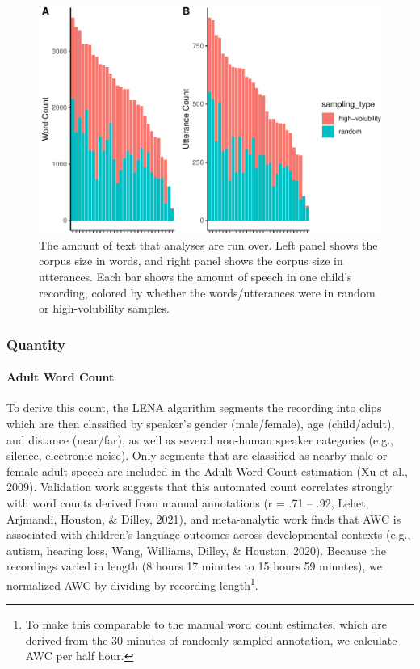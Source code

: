 \documentclass[
  man]{apa6}
\let\oldparagraph\paragraph
\renewcommand{\paragraph}[1]{\oldparagraph{#1}\mbox{}}
\begin{document}
\begin{figure}
\centering
\includegraphics{input_quality_manuscript_files/figure-latex/corpus-size-plots-1.pdf}
\caption{\label{fig:corpus-size-plots}The amount of text that analyses are run over. Left panel shows the corpus size in words, and right panel shows the corpus size in utterances. Each bar shows the amount of speech in one child's recording, colored by whether the words/utterances were in random or high-volubility samples.}
\end{figure}

\hypertarget{quantity}{%
\subsubsection{Quantity}\label{quantity}}

\hypertarget{adult-word-count}{%
\paragraph{Adult Word Count}\label{adult-word-count}}

To derive this count, the LENA algorithm segments the recording into clips which are then classified by speaker's gender (male/female), age (child/adult), and distance (near/far), as well as several non-human speaker categories (e.g., silence, electronic noise). Only segments that are classified as nearby male or female adult speech are included in the Adult Word Count estimation (Xu et al., 2009). Validation work suggests that this automated count correlates strongly with word counts derived from manual annotations (r = .71 -- .92, Lehet, Arjmandi, Houston, \& Dilley, 2021), and meta-analytic work finds that AWC is associated with children's language outcomes across developmental contexts (e.g., autism, hearing loss, Wang, Williams, Dilley, \& Houston, 2020). Because the recordings varied in length (8 hours 17 minutes to 15 hours 59 minutes), we normalized AWC by dividing by recording length\footnote{To make this comparable to the manual word count estimates, which are derived from the 30 minutes of randomly sampled annotation, we calculate AWC per half hour.}.
\end{document}

